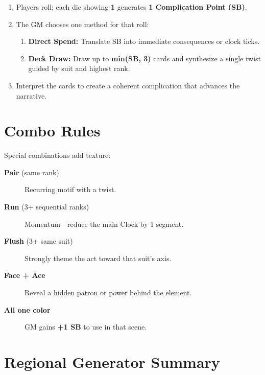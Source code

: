 \begin{enumerate}
\item Players roll; each die showing \textbf{1} generates \textbf{1 Complication Point (SB)}. 
\item The GM chooses one method for that roll:
\begin{enumerate}
    \item \textbf{Direct Spend:} Translate SB into immediate consequences or clock ticks.
    \item \textbf{Deck Draw:} Draw up to \textbf{min(SB, 3)} cards and synthesize a single twist guided by suit and highest rank.
\end{enumerate}
\item Interpret the cards to create a coherent complication that advances the narrative.
\end{enumerate}

\section{Combo Rules}
\label{sec:combo-rules}

Special combinations add texture:
\begin{description}
\item[\textbf{Pair} (same rank)] Recurring motif with a twist. 
\item[\textbf{Run} (3+ sequential ranks)] Momentum—reduce the main Clock by 1 segment. 
\item[\textbf{Flush} (3+ same suit)] Strongly theme the act toward that suit's axis. 
\item[\textbf{Face + Ace}] Reveal a hidden patron or power behind the element. 
\item[\textbf{All one color}] GM gains \textbf{+1 SB} to use in that scene. 
\end{description}

\section{Regional Generator Summary}
\label{sec:regional-summary}

